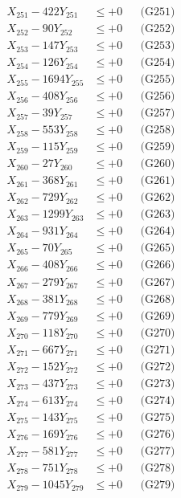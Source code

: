\documentclass[a4paper,10pt]{article}
\begin{document}
{\begin{align}
\allowbreak
X_{251} - 422Y_{251} &\leq +0 && \text{(G251)} \\
X_{252} - 90Y_{252} &\leq +0 && \text{(G252)} \\
X_{253} - 147Y_{253} &\leq +0 && \text{(G253)} \\
X_{254} - 126Y_{254} &\leq +0 && \text{(G254)} \\
X_{255} - 1694Y_{255} &\leq +0 && \text{(G255)} \\
X_{256} - 408Y_{256} &\leq +0 && \text{(G256)} \\
X_{257} - 39Y_{257} &\leq +0 && \text{(G257)} \\
X_{258} - 553Y_{258} &\leq +0 && \text{(G258)} \\
X_{259} - 115Y_{259} &\leq +0 && \text{(G259)} \\
X_{260} - 27Y_{260} &\leq +0 && \text{(G260)} \\
\allowbreak
X_{261} - 368Y_{261} &\leq +0 && \text{(G261)} \\
X_{262} - 729Y_{262} &\leq +0 && \text{(G262)} \\
X_{263} - 1299Y_{263} &\leq +0 && \text{(G263)} \\
X_{264} - 931Y_{264} &\leq +0 && \text{(G264)} \\
X_{265} - 70Y_{265} &\leq +0 && \text{(G265)} \\
X_{266} - 408Y_{266} &\leq +0 && \text{(G266)} \\
X_{267} - 279Y_{267} &\leq +0 && \text{(G267)} \\
X_{268} - 381Y_{268} &\leq +0 && \text{(G268)} \\
X_{269} - 779Y_{269} &\leq +0 && \text{(G269)} \\
X_{270} - 118Y_{270} &\leq +0 && \text{(G270)} \\
\allowbreak
X_{271} - 667Y_{271} &\leq +0 && \text{(G271)} \\
X_{272} - 152Y_{272} &\leq +0 && \text{(G272)} \\
X_{273} - 437Y_{273} &\leq +0 && \text{(G273)} \\
X_{274} - 613Y_{274} &\leq +0 && \text{(G274)} \\
X_{275} - 143Y_{275} &\leq +0 && \text{(G275)} \\
X_{276} - 169Y_{276} &\leq +0 && \text{(G276)} \\
X_{277} - 581Y_{277} &\leq +0 && \text{(G277)} \\
X_{278} - 751Y_{278} &\leq +0 && \text{(G278)} \\
X_{279} - 1045Y_{279} &\leq +0 && \text{(G279)} \\

\end{align}}
\end{document}
